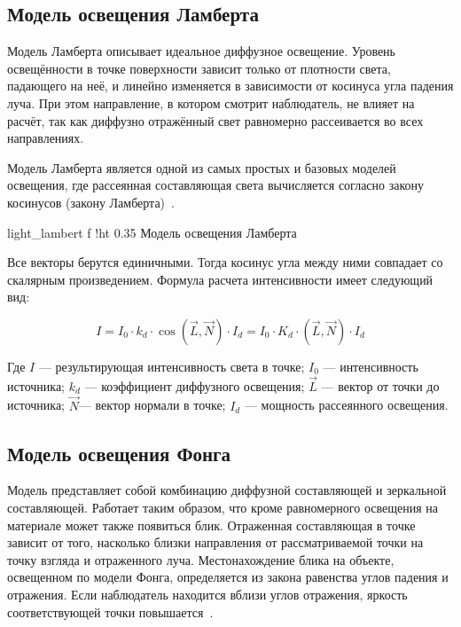 \subsection{Модель освещения Ламберта}

Модель Ламберта описывает идеальное диффузное освещение.  
Уровень освещённости в точке поверхности зависит только от плотности света, падающего на неё,  
и линейно изменяется в зависимости от косинуса угла падения луча.  
При этом направление, в котором смотрит наблюдатель, не влияет на расчёт,  
так как диффузно отражённый свет равномерно рассеивается во всех направлениях.  

Модель Ламберта является одной из самых простых и базовых моделей освещения,  
где рассеянная составляющая света вычисляется согласно закону косинусов (закону Ламберта)~\cite{LIGHT}.  


    {light_lambert}
    {f}
    {!ht}
    {0.35\textwidth}
    {Модель освещения Ламберта}

Все векторы берутся единичными. Тогда косинус угла между ними совпадает 
со скалярным произведением. Формула расчета интенсивности имеет следующий вид: 

\begin{equation}
    I = I_{0} \cdot k_{d} \cdot \cos(\vec{L}, \vec{N}) \cdot I_{d} = I_{0} \cdot K_{d} \cdot (\vec{L}, \vec{N}) \cdot I_{d}
\end{equation}

Где $I$ — результирующая интенсивность света в точке; 
$I_{0}$ — интенсивность источника; 
$k_{d}$ — коэффициент диффузного освещения;  
$\vec{L}$ — вектор от точки до источника; 
$\vec{N}$— вектор нормали в точке; 
$I_{d}$ — мощность рассеянного освещения.


\subsection{Модель освещения Фонга}
Модель представляет собой комбинацию диффузной составляющей и зеркальной составляющей. 
Работает таким образом, что кроме равномерного освещения на материале может также появиться блик. 
Отраженная составляющая в точке зависит от того, насколько близки направления от рассматриваемой 
точки на точку взгляда и отраженного луча. 
Местонахождение блика на объекте, освещенном по модели Фонга, определяется из закона равенства углов падения и отражения. 
Если наблюдатель находится вблизи углов отражения, яркость соответствующей точки повышается~\cite{LIGHT}.

